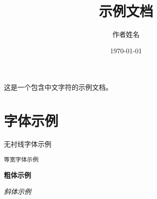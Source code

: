 \documentclass{article}
\title{示例文档}
\author{作者姓名}
\date{\today}
\begin{document}
\maketitle
这是一个包含中文字符的示例文档。

\section{字体示例}

\textsf{无衬线字体示例}

\texttt{等宽字体示例}

\textbf{粗体示例}

\textit{斜体示例}
\end{document}
